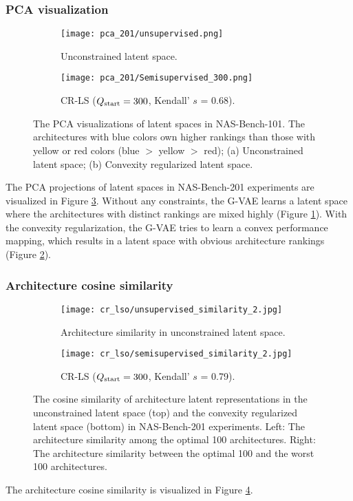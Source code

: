 \documentclass[10pt,twocolumn,letterpaper]{article}
\begin{document}
\subsubsection{PCA visualization}
\begin{figure}
	\centering
	\begin{subfigure}{1.0 \linewidth}
		\texttt{[image: pca\_201/unsupervised.png]}
		\caption{Unconstrained latent space.}
		\label{fig:pca_201_a}
	\end{subfigure}
	\begin{subfigure}{0.98 \linewidth}
		\texttt{[image: pca\_201/Semisupervised\_300.png]}
		\caption{CR-LS ($Q_{\rm start} = 300$, Kendall' $s$ = 0.68).}
		\label{fig:pca_201_b}
	\end{subfigure}
	\caption{The PCA visualizations of latent spaces in NAS-Bench-101. The architectures with blue colors own higher rankings than those with yellow or red colors (blue $>$ yellow $>$ red); (a) Unconstrained latent space; (b) Convexity regularized latent space.}
	\label{fig:pca_201}
\end{figure} 
The PCA projections of latent spaces in NAS-Bench-201 experiments are visualized in Figure \ref{fig:pca_201}. Without any constraints, the G-VAE learns a latent space where the architectures with distinct rankings are mixed highly (Figure \ref{fig:pca_201_a}). With the convexity regularization, the G-VAE tries to learn a convex performance mapping, which results in a latent space with obvious architecture rankings (Figure \ref{fig:pca_201_b}).
\subsubsection{Architecture cosine similarity} 
\begin{figure}
	\centering
	\begin{subfigure}{1.05 \linewidth}
		\texttt{[image: cr\_lso/unsupervised\_similarity\_2.jpg]}
		\caption{Architecture similarity in unconstrained latent space.}
	\end{subfigure}
	\begin{subfigure}{1.05 \linewidth}
		\texttt{[image: cr\_lso/semisupervised\_similarity\_2.jpg]}
		\caption{CR-LS ($Q_{\rm start} = 300$, Kendall' $s$ = 0.79).}
	\end{subfigure}
	\caption{The cosine similarity of architecture latent representations in the unconstrained latent space (top) and the convexity regularized latent space (bottom) in NAS-Bench-201 experiments. Left: The architecture similarity among the optimal 100 architectures. Right: The architecture similarity between the optimal 100 and the worst 100 architectures. }
	\label{fig:cos_201}
\end{figure} 
The architecture cosine similarity is visualized in Figure \ref{fig:cos_201}. 
\end{document}
